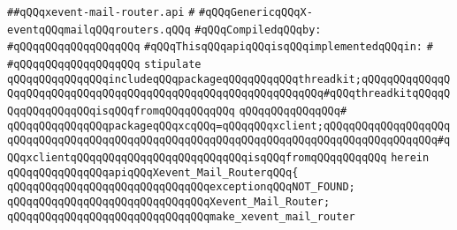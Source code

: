 \label{src/lib/x-kit/widget/old/basic/xevent-mail-router.api}
\verb|##qQQqxevent-mail-router.api|\newline
\verb|#|\newline
\verb|#qQQqGenericqQQqX-eventqQQqmailqQQqrouters.qQQq|\newline
\newline
\verb|#qQQqCompiledqQQqby:|\newline
\verb|#qQQqqQQqqQQqqQQqqQQq|\newline
\newline
\newline
\verb|#qQQqThisqQQqapiqQQqisqQQqimplementedqQQqin:|\newline
\verb|#|\newline
\verb|#qQQqqQQqqQQqqQQqqQQq|\newline
\newline
\verb|stipulate|\newline
\verb|qQQqqQQqqQQqqQQqincludeqQQqpackageqQQqqQQqqQQqthreadkit;qQQqqQQqqQQqqQQqqQQqqQQqqQQqqQQqqQQqqQQqqQQqqQQqqQQqqQQqqQQqqQQq#qQQqthreadkitqQQqqQQqqQQqqQQqqQQqisqQQqfromqQQqqQQqqQQq|\newline
\verb|qQQqqQQqqQQqqQQq#|\newline
\verb|qQQqqQQqqQQqqQQqpackageqQQqxcqQQq=qQQqqQQqxclient;qQQqqQQqqQQqqQQqqQQqqQQqqQQqqQQqqQQqqQQqqQQqqQQqqQQqqQQqqQQqqQQqqQQqqQQqqQQqqQQqqQQqqQQq#qQQqxclientqQQqqQQqqQQqqQQqqQQqqQQqqQQqisqQQqfromqQQqqQQqqQQq|\newline
\verb|herein|\newline
\newline
\verb|qQQqqQQqqQQqqQQqapiqQQqXevent_Mail_RouterqQQq{|\newline
\newline
\verb|qQQqqQQqqQQqqQQqqQQqqQQqqQQqqQQqexceptionqQQqNOT_FOUND;|\newline
\newline
\verb|qQQqqQQqqQQqqQQqqQQqqQQqqQQqqQQqXevent_Mail_Router;|\newline
\newline
\verb|qQQqqQQqqQQqqQQqqQQqqQQqqQQqqQQqmake_xevent_mail_router|\newline
